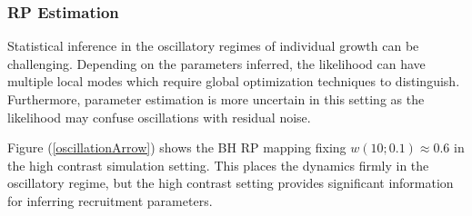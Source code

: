 %
\subsubsection{RP Estimation}

%
Statistical inference in the oscillatory regimes of individual growth can be 
challenging. Depending on the parameters inferred, the likelihood can have 
multiple local modes which require global optimization techniques to distinguish. 
Furthermore, parameter estimation is more uncertain in this setting as the 
likelihood may confuse oscillations with residual noise.

%

Figure (\ref{oscillationArrow}) shows the BH RP mapping fixing $w(10;0.1)\approx0.6$
in the high contrast simulation setting. This places the
dynamics firmly in the oscillatory regime, but the high 
contrast setting provides significant information for 
inferring recruitment parameters.

